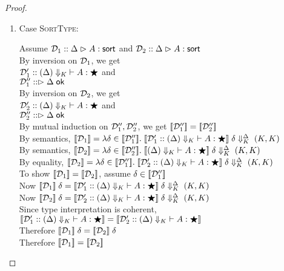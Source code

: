 \begin{proof}
\begin{enumerate}
\item Case \textsc{SortType}: 
  \begin{tabbedproof}
  \oo Assume $\ms{D}_1 :: \judgeSort{A}$ and $\ms{D}_2 :: \judgeSort{A}$ \\
  \ooo By inversion on $\ms{D}_1$, we get \\
  \oooo $\ms{D}'_1 :: \judgeWK[\restrictkind{\Delta}]{A}{\bigstar}$ and  \\
  \oooo $\ms{D}''_1 :: \judgeACtx{\Delta}$ \\
  \ooo By inversion on $\ms{D}_2$, we get \\
  \oooo $\ms{D}'_2 :: \judgeWK[\restrictkind{\Delta}]{A}{\bigstar}$ and  \\
  \oooo $\ms{D}''_2 :: \judgeACtx{\Delta}$ \\
  \ooo By mutual induction on $\ms{D}''_1, \ms{D}''_2$, we get $\interp{\ms{D}''_1} = \interp{\ms{D}''_2}$ \\
  \ooo By semantics, $\interp{\ms{D}_1} = 
            \semfun{\delta \in \interp{\ms{D}''_1}}
                   {\interp{\ms{D}'_1 :: \judgeWK[\restrictkind{\Delta}]{A}{\bigstar}}
                      \;\restricttyenv{\Delta}{\delta}\;(K,K)}$ \\
  \ooo By semantics, $\interp{\ms{D}_2} = 
            \semfun{\delta \in \interp{\ms{D}''_2}}
                   {\interp{\judgeWK[\restrictkind{\Delta}]{A}{\bigstar}}
                      \;\restricttyenv{\Delta}{\delta}\;(K,K)}$ \\
  \ooo By equality, $\interp{\ms{D}_2} = 
            \semfun{\delta \in \interp{\ms{D}''_1}}
                   {\interp{\ms{D}'_2 :: \judgeWK[\restrictkind{\Delta}]{A}{\bigstar}}
                      \;\restricttyenv{\Delta}{\delta}\;(K,K)}$ \\
  \ooo To show $\interp{\ms{D}_1} = \interp{\ms{D}_2}$, assume $\delta \in \interp{\ms{D}''_1}$\\
  \oooo Now $\interp{\ms{D}_1}\;\delta = 
                \interp{\ms{D}'_1 :: \judgeWK[\restrictkind{\Delta}]{A}{\bigstar}}
                      \;\restricttyenv{\Delta}{\delta}\;(K,K)$ \\
  \oooo Now $\interp{\ms{D}_2}\;\delta = 
                \interp{\ms{D}'_2 :: \judgeWK[\restrictkind{\Delta}]{A}{\bigstar}}
                      \;\restricttyenv{\Delta}{\delta}\;(K,K)$ \\
  \oooo Since type interpretation is coherent, \\
  \oooo \; $\interp{\ms{D}'_1 :: \judgeWK[\restrictkind{\Delta}]{A}{\bigstar}} =
             \interp{\ms{D}'_2 :: \judgeWK[\restrictkind{\Delta}]{A}{\bigstar}}$ \\
  \oooo Therefore $\interp{\ms{D}_1}\;\delta = \interp{\ms{D}_2}\;\delta$ \\
  \ooo Therefore $\interp{\ms{D}_1} = \interp{\ms{D}_2}$
  \end{tabbedproof}
\end{enumerate}
\end{proof}


